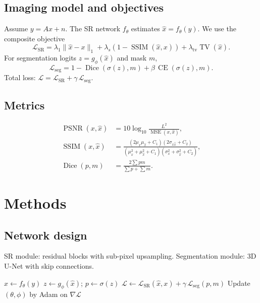 \documentclass[12pt,a4paper,twoside,openright]{book}
\begin{document}
\section{Imaging model and objectives}
Assume \(y = A x + n\). The SR network \(f_\theta\) estimates
\(\hat x = f_\theta(y)\).
We use the composite objective
\begin{equation}
  \mathcal{L}_{\mathrm{SR}}
  = \lambda_1 \lVert \hat x - x \rVert_1
  + \lambda_s \left(1-\operatorname{SSIM}(\hat x, x)\right)
  + \lambda_{\mathrm{tv}} \operatorname{TV}(\hat x).
  \label{eq:sr_loss}
\end{equation}
For segmentation logits \(z = g_\phi(\hat x)\) and mask \(m\),
\begin{equation}
  \mathcal{L}_{\mathrm{seg}}
  = 1 - \operatorname{Dice}\!\left(\sigma(z), m\right)
    + \beta\, \operatorname{CE}\!\left(\sigma(z), m\right).
  \label{eq:seg_loss}
\end{equation}
Total loss:
\(\mathcal{L} = \mathcal{L}_{\mathrm{SR}} + \gamma\,\mathcal{L}_{\mathrm{seg}}\).

\section{Metrics}
\begin{align}
\operatorname{PSNR}(x,\hat x) &= 10\log_{10}\!\frac{L^2}{\operatorname{MSE}(x,\hat x)},\\
\operatorname{SSIM}(x,\hat x) &= \frac{(2\mu_x\mu_{\hat x}+C_1)(2\sigma_{x\hat x}+C_2)}
{(\mu_x^2+\mu_{\hat x}^2+C_1)(\sigma_x^2+\sigma_{\hat x}^2+C_2)},\\
\operatorname{Dice}(p,m) &= \frac{2\sum p m}{\sum p + \sum m}.
\end{align}

\lipsum[1-23]


\chapter{Methods}
\section{Network design}
SR module: residual blocks with sub-pixel upsampling.
Segmentation module: 3D U-Net with skip connections. \cite{lecun2015deep}

\begin{algorithm}
\caption{Joint SR+Seg training}
\label{alg:train}
\begin{algorithmic}[1]
      \State $\hat x \gets f_\theta(y)$
      \State $z \gets g_\phi(\hat x)$; $p\gets\sigma(z)$
      \State $\mathcal{L}\gets \mathcal{L}_{\mathrm{SR}}(\hat x,x)+\gamma\,\mathcal{L}_{\mathrm{seg}}(p,m)$
      \State Update $(\theta,\phi)$ by Adam on $\nabla \mathcal{L}$
    \EndFor
  \EndFor
\EndProcedure
\end{algorithmic}
\end{algorithm}
\end{document}
